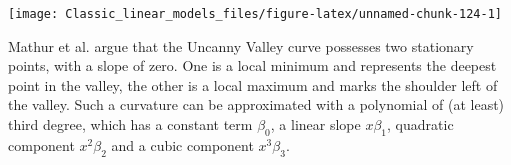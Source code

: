 \documentclass[]{svmono}
\newenvironment{Shaded}{\begin{snugshade}}{\end{snugshade}}
\newcommand{\KeywordTok}[1]{\textcolor[rgb]{0.13,0.29,0.53}{\textbf{#1}}}
\newcommand{\DataTypeTok}[1]{\textcolor[rgb]{0.13,0.29,0.53}{#1}}
\newcommand{\DecValTok}[1]{\textcolor[rgb]{0.00,0.00,0.81}{#1}}
\newcommand{\FloatTok}[1]{\textcolor[rgb]{0.00,0.00,0.81}{#1}}
\newcommand{\StringTok}[1]{\textcolor[rgb]{0.31,0.60,0.02}{#1}}
\newcommand{\OperatorTok}[1]{\textcolor[rgb]{0.81,0.36,0.00}{\textbf{#1}}}
\newcommand{\NormalTok}[1]{#1}
\begin{document}
\begin{Shaded}
\end{Shaded}

\texttt{[image: Classic\_linear\_models\_files/figure-latex/unnamed-chunk-124-1]}

Mathur et al. argue that the Uncanny Valley curve possesses two
stationary points, with a slope of zero. One is a local minimum and
represents the deepest point in the valley, the other is a local maximum
and marks the shoulder left of the valley. Such a curvature can be
approximated with a polynomial of (at least) third degree, which has a
constant term \(\beta_0\), a linear slope \(x\beta_1\), quadratic
component \(x^2\beta_2\) and a cubic component \(x^3\beta_3\).
\end{document}
